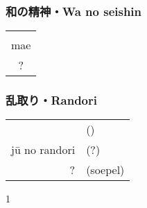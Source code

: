 \subsubsection{和の精神・Wa no seishin}
\begin{table}[H]
\begin{center}
\begin{tabular}{c}
    \ruby{}{}\\
    mae\\
    ?
\end{tabular}
\end{center}
\label{kyuu_3_wa_no_seishin}
\end{table}

\subsubsection{乱取り・Randori}
\begin{table}[H]
\begin{center}
\begin{tabular}{rl}
    \ruby{}{} & (\ruby{}{})\\
    j\={u} no randori & (?)\\
    ? & (soepel)
\end{tabular}
\end{center}
\label{kyuu_3_randori}
\end{table}
\begin{center}
    1 
\end{center}
